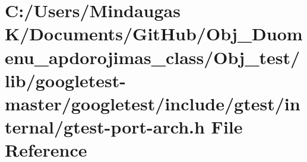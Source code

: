 \hypertarget{_obj__test_2lib_2googletest-master_2googletest_2include_2gtest_2internal_2gtest-port-arch_8h}{}\section{C\+:/\+Users/\+Mindaugas K/\+Documents/\+Git\+Hub/\+Obj\+\_\+\+Duomenu\+\_\+apdorojimas\+\_\+class/\+Obj\+\_\+test/lib/googletest-\/master/googletest/include/gtest/internal/gtest-\/port-\/arch.h File Reference}
\label{_obj__test_2lib_2googletest-master_2googletest_2include_2gtest_2internal_2gtest-port-arch_8h}
